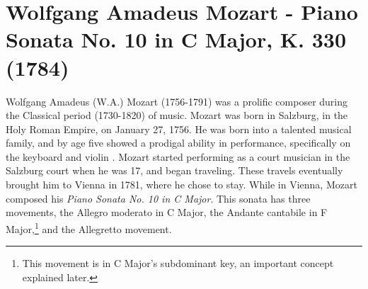 \chapter[Mozart's Piano Sonata No. 10 in C Major, K. 330]{Wolfgang Amadeus Mozart - Piano Sonata No. 10 in C Major, K. 330 (1784)}
Wolfgang Amadeus (W.A.) Mozart (1756-1791) was a prolific composer during the Classical period (1730-1820) of music. Mozart was born in Salzburg, in the Holy Roman Empire, on January 27, 1756\autocite{Burkholder_Grout_Palisca_2014}. He was born into a talented musical family, and by age five showed a prodigal ability in performance, specifically on the keyboard and violin \autocite{Eisen_Sadie_2001}. Mozart started performing as a court musician in the Salzburg court when he was 17, and began traveling. These travels eventually brought him to Vienna in 1781, where he chose to stay. While in Vienna, Mozart composed his \textit{Piano Sonata No. 10 in C Major}. This sonata has three movements, the Allegro moderato in C Major, the Andante cantabile in F Major,\footnote{This movement is in C Major's subdominant key, an important concept explained later.} and the Allegretto movement. 

